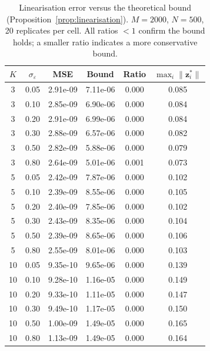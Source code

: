 \begin{table}[t]
\centering
\caption{Linearisation error versus the theoretical bound (Proposition~\ref{prop:linearisation}). $M=2000$, $N=500$, 20 replicates per cell. All ratios $<1$ confirm the bound holds; a smaller ratio indicates a more conservative bound.}
\label{tab:block2}
\begin{tabular}{cccccc}
\toprule
$K$ & $\sigma_\varepsilon$ & MSE & Bound & Ratio & $\max_i\|\mathbf{z}_i^\ast\|$ \\
\midrule
3 & 0.05 & 2.91e-09 & 7.11e-06 & 0.000 & 0.085 \\
3 & 0.10 & 2.85e-09 & 6.90e-06 & 0.000 & 0.084 \\
3 & 0.20 & 2.91e-09 & 6.99e-06 & 0.000 & 0.084 \\
3 & 0.30 & 2.88e-09 & 6.57e-06 & 0.000 & 0.082 \\
3 & 0.50 & 2.82e-09 & 5.88e-06 & 0.000 & 0.079 \\
3 & 0.80 & 2.64e-09 & 5.01e-06 & 0.001 & 0.073 \\
5 & 0.05 & 2.42e-09 & 7.87e-06 & 0.000 & 0.102 \\
5 & 0.10 & 2.39e-09 & 8.55e-06 & 0.000 & 0.105 \\
5 & 0.20 & 2.40e-09 & 7.85e-06 & 0.000 & 0.102 \\
5 & 0.30 & 2.43e-09 & 8.35e-06 & 0.000 & 0.104 \\
5 & 0.50 & 2.39e-09 & 8.65e-06 & 0.000 & 0.106 \\
5 & 0.80 & 2.55e-09 & 8.01e-06 & 0.000 & 0.103 \\
10 & 0.05 & 9.35e-10 & 9.65e-06 & 0.000 & 0.139 \\
10 & 0.10 & 9.28e-10 & 1.16e-05 & 0.000 & 0.149 \\
10 & 0.20 & 9.33e-10 & 1.11e-05 & 0.000 & 0.147 \\
10 & 0.30 & 9.49e-10 & 1.17e-05 & 0.000 & 0.150 \\
10 & 0.50 & 1.00e-09 & 1.49e-05 & 0.000 & 0.165 \\
10 & 0.80 & 1.13e-09 & 1.49e-05 & 0.000 & 0.164 \\
\bottomrule
\end{tabular}
\end{table}
